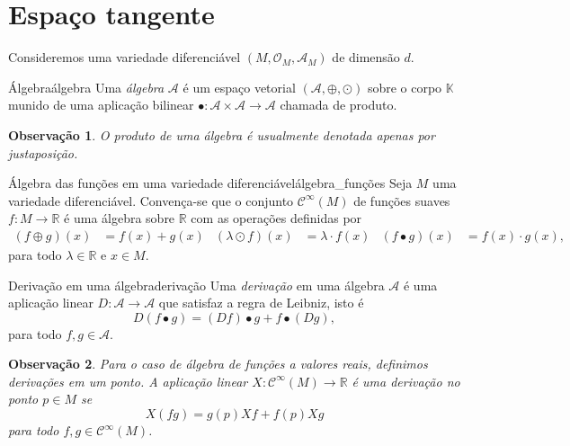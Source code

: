 \documentclass[12pt,a4paper]{article}
\numberwithin{equation}{section}
\newcommand\smooth[1]{\ensuremath{\mathcal{C}^\infty(#1)}}
\newcommand\manifold[1]{\ensuremath{\left(#1, \mathcal{O}_{#1}, \mathscr{A}_{#1}\right)}}
\newtheorem{remark}{Observação}[section]
\begin{document}
\section{Espaço tangente}
Consideremos uma variedade diferenciável \manifold{M} de dimensão \(d\).

\begin{definition}{Álgebra}{álgebra}
    Uma \emph{álgebra} \(\mathcal{A}\) é um espaço vetorial \((\mathcal{A}, \oplus, \odot)\) sobre o corpo \(\mathbb{K}\) munido de uma aplicação bilinear \(\bullet : \mathcal{A} \times \mathcal{A} \to \mathcal{A}\) chamada de produto.
\end{definition}
\begin{remark}
    O produto de uma álgebra é usualmente denotada apenas por justaposição.
\end{remark}

\begin{exercício}{Álgebra das funções em uma variedade diferenciável}{álgebra_funções}
    Seja \(M\) uma variedade diferenciável. Convença-se que o conjunto \smooth{M} de funções suaves \(f : M \to \mathbb{R}\) é uma álgebra sobre \(\mathbb{R}\) com as operações definidas por
    \begin{align*}
        (f\oplus g)(x) &= f(x) + g(x) &
        (\lambda \odot f)(x) &= \lambda \cdot f(x) &
        (f \bullet g)(x) &= f(x) \cdot g(x),
    \end{align*}
    para todo \(\lambda \in \mathbb{R}\) e \(x \in M\).
\end{exercício}

\begin{definition}{Derivação em uma álgebra}{derivação}
    Uma \emph{derivação} em uma álgebra \(\mathcal{A}\) é uma aplicação linear \(D : \mathcal{A} \to \mathcal{A}\) que satisfaz a regra de Leibniz, isto é
    \begin{equation*}
        D(f\bullet g) = (Df) \bullet g + f \bullet (Dg),
    \end{equation*}
    para todo \(f,g \in \mathcal{A}.\)
\end{definition}
\begin{remark}
    Para o caso de álgebra de funções a valores reais, definimos \emph{derivações em um ponto}. A aplicação linear \(X : \smooth{M} \to \mathbb{R}\) é uma derivação no ponto \(p \in M\) se
    \begin{equation*}
        X(fg) = g(p) Xf + f(p) Xg
    \end{equation*}
    para todo \(f,g \in \smooth{M}\).
\end{remark}
\end{document}
